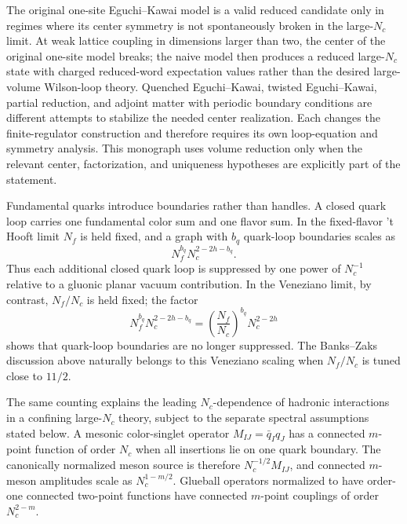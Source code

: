 \begin{remark}
\label{ca:qcd-eguchi-kawai-status}
The original one-site Eguchi--Kawai model is a valid reduced candidate only in
regimes where its center symmetry is not spontaneously broken in the
large-\(N_c\) limit.  At weak lattice coupling in dimensions larger than two,
the center of the original one-site model breaks; the naive model then
produces a reduced large-\(N_c\) state with charged reduced-word expectation
values rather than the desired large-volume Wilson-loop theory.
Quenched Eguchi--Kawai, twisted Eguchi--Kawai, partial reduction, and adjoint
matter with periodic boundary conditions are different attempts to stabilize
the needed center realization.  Each changes the finite-regulator construction and
therefore requires its own loop-equation and symmetry analysis.  This
monograph uses volume reduction only when the relevant center, factorization,
and uniqueness hypotheses are explicitly part of the statement.
\end{remark}

Fundamental quarks introduce boundaries rather than handles.  A closed quark
loop carries one fundamental color sum and one flavor sum.  In the fixed-flavor
't Hooft limit \(N_f\) is held fixed, and a graph with \(b_q\) quark-loop
boundaries scales as
\begin{equation}
  N_f^{b_q}N_c^{2-2h-b_q}.
  \label{eq:qcd-large-n-quark-boundary-fixed-nf}
\end{equation}
Thus each additional closed quark loop is suppressed by one power of
\(N_c^{-1}\) relative to a gluonic planar vacuum contribution.  In the
Veneziano limit, by contrast, \(N_f/N_c\) is held fixed; the factor
\[
  N_f^{b_q}N_c^{2-2h-b_q}
  =
  \left(\frac{N_f}{N_c}\right)^{b_q}N_c^{2-2h}
\]
shows that quark-loop boundaries are no longer suppressed.  The Banks--Zaks
discussion above naturally belongs to this Veneziano scaling when
\(N_f/N_c\) is tuned close to \(11/2\).

The same counting explains the leading \(N_c\)-dependence of hadronic
interactions in a confining large-\(N_c\) theory, subject to the separate
spectral assumptions stated below.  A mesonic color-singlet operator
\(M_{IJ}=\bar q_I q_J\) has a connected \(m\)-point function of order \(N_c\)
when all insertions lie on one quark boundary.  The canonically normalized
meson source is therefore \(N_c^{-1/2}M_{IJ}\), and connected \(m\)-meson
amplitudes scale as \(N_c^{1-m/2}\).  Glueball operators normalized to have
order-one connected two-point functions have connected \(m\)-point couplings
of order \(N_c^{2-m}\).

